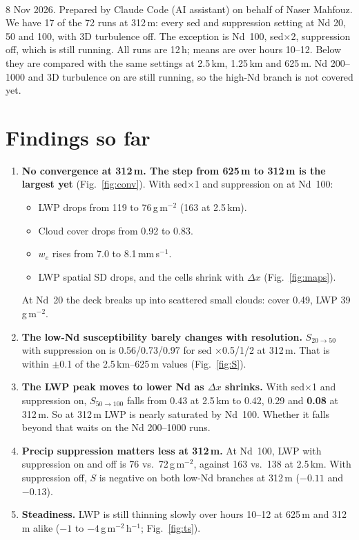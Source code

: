 \documentclass[10pt]{article}
\begin{document}
\sloppy
{}\\[2pt]
8 Nov 2026. Prepared by Claude Code (AI assistant) on behalf of Naser Mahfouz.
We have 17 of the 72 runs at 312\,m: every sed and suppression setting at Nd 20, 50 and 100, with 3D turbulence off. The exception is Nd~100, sed$\times$2, suppression off, which is still running.
All runs are 12\,h; means are over hours 10--12. Below they are compared with the same settings at 2.5\,km, 1.25\,km and 625\,m.
Nd 200--1000 and 3D turbulence on are still running, so the high-Nd branch is not covered yet.

\section*{Findings so far}
\begin{enumerate}
\item \textbf{No convergence at 312\,m. The step from 625\,m to 312\,m is the largest yet} (Fig.~\ref{fig:conv}). With sed$\times$1 and suppression on at Nd~100:
\begin{itemize}
\item LWP drops from 119 to 76\,g\,m$^{-2}$ (163 at 2.5\,km).
\item Cloud cover drops from 0.92 to 0.83.
\item $w_e$ rises from 7.0 to 8.1\,mm\,s$^{-1}$.
\item LWP spatial SD drops, and the cells shrink with $\Delta x$ (Fig.~\ref{fig:maps}).
\end{itemize}
At Nd~20 the deck breaks up into scattered small clouds: cover 0.49, LWP 39\,g\,m$^{-2}$.
\item \textbf{The low-Nd susceptibility barely changes with resolution.} $S_{20\to50}$ with suppression on is 0.56/0.73/0.97 for sed $\times$0.5/1/2 at 312\,m.
That is within $\pm$0.1 of the 2.5\,km--625\,m values (Fig.~\ref{fig:S}).
\item \textbf{The LWP peak moves to lower Nd as $\Delta x$ shrinks.} With sed$\times$1 and suppression on, $S_{50\to100}$ falls from 0.43 at 2.5\,km to 0.42, 0.29 and \textbf{0.08} at 312\,m.
So at 312\,m LWP is nearly saturated by Nd~100. Whether it falls beyond that waits on the Nd 200--1000 runs.
\item \textbf{Precip suppression matters less at 312\,m.} At Nd~100, LWP with suppression on and off is 76 vs.\ 72\,g\,m$^{-2}$, against 163 vs.\ 138 at 2.5\,km.
With suppression off, $S$ is negative on both low-Nd branches at 312\,m ($-0.11$ and $-0.13$).
\item \textbf{Steadiness.} LWP is still thinning slowly over hours 10--12 at 625\,m and 312\,m alike ($-1$ to $-4$\,g\,m$^{-2}$\,h$^{-1}$; Fig.~\ref{fig:ts}).
\end{enumerate}
\end{document}
